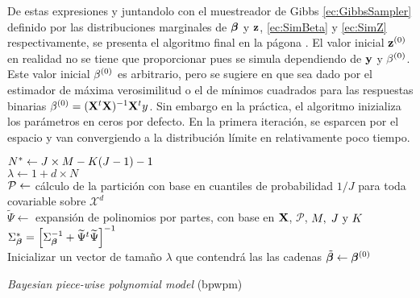 \documentclass[../Main/Main.tex]{subfiles}
\begin{document}
De estas expresiones y juntandolo con el muestreador de Gibbs \eqref{ec:GibbsSampler} definido por las distribuciones marginales de $\betabf$ y $\zsn$,  \eqref{ec:SimBeta} y \eqref{ec:SimZ} respectivamente, se presenta el algoritmo final en la págona \pageref{alg:bpwpm}. El valor inicial $\zsn\iter{0}$ en realidad no se tiene que proporcionar pues se simula dependiendo de $\ysn$ y $\beta\iter{0}$. Este valor inicial $\beta\iter{0}$ es arbitrario, pero se sugiere en \citet{albert1993bayesian} que sea dado por el estimador de máxima verosimilitud o el de mínimos cuadrados para las respuestas binarias $\beta\iter{0} = (\xmat^t\xmat)^{-1}\xmat^ty$. Sin embargo en la práctica, el algoritmo inizializa los parámetros en ceros por defecto. En la primera iteración, se esparcen por el espacio y van convergiendo a la distribución límite en relativamente poco tiempo.

\begin{algorithm}[p]
 
 $\N \leftarrow J\times M - K(J-1) - 1$ \\
 $\lambda \leftarrow 1 + d\times N$ \\
 $\P \leftarrow$ cálculo de la partición con base en cuantiles de probabilidad $1/J$ para toda covariable sobre $\mathcal{X}^d$ \\
 $\widetilde{\Psi} \leftarrow $ expansión de polinomios por partes, con base en $\xmat$, $\mathcal{P}$, $\MJK$\\
 $\Sigma_{\betabf}^* = \left[\Sigma_{\betabf}^{-1} + \widetilde{\Psi}^t\widetilde{\Psi}\right]^{-1}	$ \\
 Inicializar un vector de tamaño $\lambda$ que contendrá las las cadenas $\tilde{\betabf} \leftarrow \betabf\iter{0}$\\
 \caption{\textit{Bayesian piece-wise polynomial model} (bpwpm)}
 \label{alg:bpwpm}
\end{algorithm}
\end{document}

